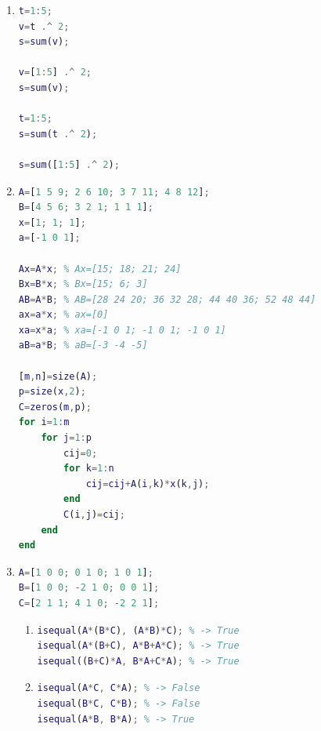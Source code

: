 \documentclass{article}
\begin{document}
\begin{enumerate}
\item
\begin{lstlisting}[language=matlab]
t=1:5;
v=t .^ 2;
s=sum(v);

v=[1:5] .^ 2;
s=sum(v);

t=1:5;
s=sum(t .^ 2);

s=sum([1:5] .^ 2);
\end{lstlisting}

\item
\begin{lstlisting}[language=matlab]
A=[1 5 9; 2 6 10; 3 7 11; 4 8 12];
B=[4 5 6; 3 2 1; 1 1 1];
x=[1; 1; 1];
a=[-1 0 1];

Ax=A*x; % Ax=[15; 18; 21; 24]
Bx=B*x; % Bx=[15; 6; 3]
AB=A*B; % AB=[28 24 20; 36 32 28; 44 40 36; 52 48 44]
ax=a*x; % ax=[0]
xa=x*a; % xa=[-1 0 1; -1 0 1; -1 0 1]
aB=a*B; % aB=[-3 -4 -5]

[m,n]=size(A);
p=size(x,2);
C=zeros(m,p);
for i=1:m
    for j=1:p
        cij=0;
        for k=1:n
            cij=cij+A(i,k)*x(k,j);
        end
        C(i,j)=cij;
    end
end
\end{lstlisting}

\item
\begin{lstlisting}[language=matlab]
A=[1 0 0; 0 1 0; 1 0 1];
B=[1 0 0; -2 1 0; 0 0 1];
C=[2 1 1; 4 1 0; -2 2 1];
\end{lstlisting}

\begin{enumerate}

\item
\begin{lstlisting}[language=matlab]
isequal(A*(B*C), (A*B)*C); % -> True
isequal(A*(B+C), A*B+A*C); % -> True
isequal((B+C)*A, B*A+C*A); % -> True    
\end{lstlisting}

\item
\begin{lstlisting}[language=matlab]
isequal(A*C, C*A); % -> False
isequal(B*C, C*B); % -> False
isequal(A*B, B*A); % -> True
\end{lstlisting}

\end{enumerate}

\end{enumerate}
\end{document}
